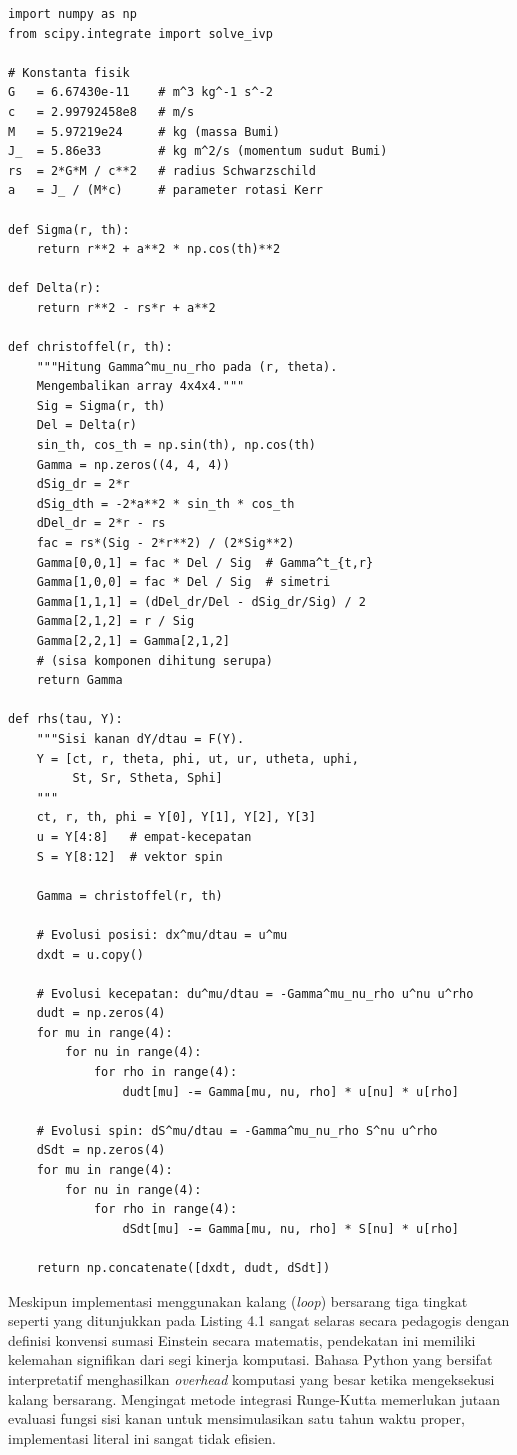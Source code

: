 \begin{lstlisting}[caption={Implementasi fungsi sisi kanan sistem ODE.},
    label={lst:rhs}]
import numpy as np
from scipy.integrate import solve_ivp

# Konstanta fisik
G   = 6.67430e-11    # m^3 kg^-1 s^-2
c   = 2.99792458e8   # m/s
M   = 5.97219e24     # kg (massa Bumi)
J_  = 5.86e33        # kg m^2/s (momentum sudut Bumi)
rs  = 2*G*M / c**2   # radius Schwarzschild
a   = J_ / (M*c)     # parameter rotasi Kerr

def Sigma(r, th):
    return r**2 + a**2 * np.cos(th)**2

def Delta(r):
    return r**2 - rs*r + a**2

def christoffel(r, th):
    """Hitung Gamma^mu_nu_rho pada (r, theta).
    Mengembalikan array 4x4x4."""
    Sig = Sigma(r, th)
    Del = Delta(r)
    sin_th, cos_th = np.sin(th), np.cos(th)
    Gamma = np.zeros((4, 4, 4))
    dSig_dr = 2*r
    dSig_dth = -2*a**2 * sin_th * cos_th
    dDel_dr = 2*r - rs
    fac = rs*(Sig - 2*r**2) / (2*Sig**2)
    Gamma[0,0,1] = fac * Del / Sig  # Gamma^t_{t,r}
    Gamma[1,0,0] = fac * Del / Sig  # simetri
    Gamma[1,1,1] = (dDel_dr/Del - dSig_dr/Sig) / 2
    Gamma[2,1,2] = r / Sig
    Gamma[2,2,1] = Gamma[2,1,2]
    # (sisa komponen dihitung serupa)
    return Gamma

def rhs(tau, Y):
    """Sisi kanan dY/dtau = F(Y).
    Y = [ct, r, theta, phi, ut, ur, utheta, uphi,
         St, Sr, Stheta, Sphi]
    """
    ct, r, th, phi = Y[0], Y[1], Y[2], Y[3]
    u = Y[4:8]   # empat-kecepatan
    S = Y[8:12]  # vektor spin

    Gamma = christoffel(r, th)

    # Evolusi posisi: dx^mu/dtau = u^mu
    dxdt = u.copy()

    # Evolusi kecepatan: du^mu/dtau = -Gamma^mu_nu_rho u^nu u^rho
    dudt = np.zeros(4)
    for mu in range(4):
        for nu in range(4):
            for rho in range(4):
                dudt[mu] -= Gamma[mu, nu, rho] * u[nu] * u[rho]

    # Evolusi spin: dS^mu/dtau = -Gamma^mu_nu_rho S^nu u^rho
    dSdt = np.zeros(4)
    for mu in range(4):
        for nu in range(4):
            for rho in range(4):
                dSdt[mu] -= Gamma[mu, nu, rho] * S[nu] * u[rho]

    return np.concatenate([dxdt, dudt, dSdt])
\end{lstlisting}

Meskipun implementasi menggunakan kalang (\textit{loop}) bersarang tiga tingkat seperti yang ditunjukkan pada Listing 4.1 sangat selaras secara pedagogis dengan definisi konvensi sumasi Einstein secara matematis, pendekatan ini memiliki kelemahan signifikan dari segi kinerja komputasi. Bahasa Python yang bersifat interpretatif menghasilkan \textit{overhead} komputasi yang besar ketika mengeksekusi kalang bersarang. Mengingat metode integrasi Runge-Kutta memerlukan jutaan evaluasi fungsi sisi kanan untuk mensimulasikan satu tahun waktu proper, implementasi literal ini sangat tidak efisien.


